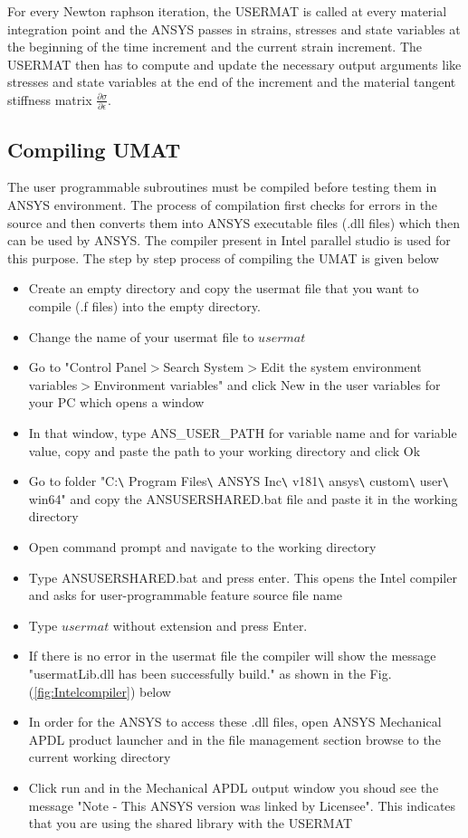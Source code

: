 \documentclass[a4paper,12pt]{extarticle}
\begin{document}
For every Newton raphson iteration, the USERMAT is called at every material integration point and the ANSYS passes in strains, stresses and state variables at the beginning of the time increment and the current strain increment. The USERMAT then has to compute and update the necessary output arguments like stresses and state variables at the end of the increment and the material tangent stiffness matrix $\frac{\partial \sigma}{\partial \epsilon} $.
\vspace*{0.6cm}
\subsection{Compiling UMAT}
\indent\indent\indent The user programmable subroutines must be compiled before testing them in ANSYS environment. The process of compilation first checks for errors in the source and then converts them into ANSYS executable files (.dll files) which then can be used by ANSYS. The compiler present in Intel parallel studio is used for this purpose. The step by step process of compiling the UMAT is given below\\
\begin{itemize}
\item Create an empty directory and copy the usermat file that you want to compile (.f files) into the empty directory.
\item Change the name of your usermat file to $usermat$
\item Go to "Control Panel$>$Search System$>$Edit the system environment variables$>$Environment variables" and click New in the user variables for your PC which opens a window
\item In that window, type ANS\_USER\_PATH for variable name and for variable value, copy and paste the path to your working directory and click Ok
\item Go to folder "C:\texttt{\textbackslash} Program Files\texttt{\textbackslash} ANSYS Inc\texttt{\textbackslash} v181\texttt{\textbackslash} ansys\texttt{\textbackslash} custom\texttt{\textbackslash} user\texttt{\textbackslash} win64" and copy the ANSUSERSHARED.bat file and paste it in the working directory
\item Open command prompt and navigate to the working directory
\item Type ANSUSERSHARED.bat and press enter. This opens the Intel compiler and asks for user-programmable feature source file name
\item Type $usermat$ without extension and press Enter.
\item If there is no error in the usermat file the compiler will show the message "usermatLib.dll has been successfully build." as shown in the Fig.(\ref{fig:Intelcompiler}) below 
\item In order for the ANSYS to access these .dll files, open ANSYS Mechanical APDL product launcher and in the file management section browse to the current working directory
\item Click run and in the Mechanical APDL output window you shoud see the message "Note - This ANSYS version was linked by Licensee". This indicates that you are using the shared library with the USERMAT\\
\end{itemize} 
\end{document}
